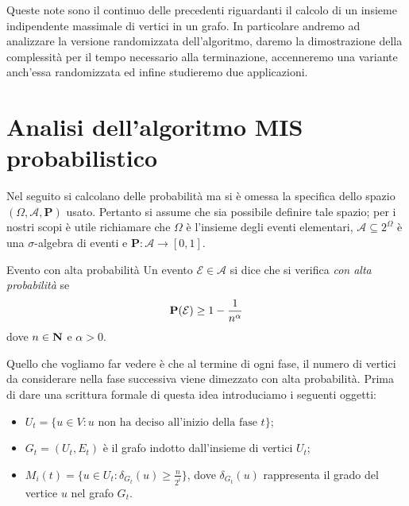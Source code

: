 \documentclass{article}
\begin{document}
\maketitle

Queste note sono il continuo delle precedenti riguardanti il calcolo di
un insieme indipendente massimale di vertici in un grafo. In particolare
andremo ad analizzare la versione randomizzata dell'algoritmo, daremo la 
dimostrazione della complessit\`a per il tempo necessario alla terminazione, 
accenneremo una variante anch'essa randomizzata ed infine studieremo due applicazioni.

\section{Analisi dell'algoritmo MIS probabilistico}
Nel seguito si calcolano delle probabilit\`a ma si \`e omessa la
specifica dello spazio $(\Omega, \mathcal{A}, \mathbf{P})$ 
usato. Pertanto si assume che sia possibile definire tale spazio; per i
nostri scopi \`e utile richiamare che $\Omega$ \`e l'insieme degli 
eventi elementari, $\mathcal{A}\subseteq 2^{\Omega}$ 
\`e una $\sigma$-algebra di eventi e 
$\mathbf{P}: \mathcal{A} \rightarrow [0,1]$.

\begin{defn}{Evento con alta probabilit\`a}
Un evento $\mathcal{E} \in \mathcal{A}$ si dice che si verifica \emph{
con alta probabilit\`a} se 
\begin{displaymath}
    \mathbf{P}(\mathcal{E}) \geq 1 - {{1} \over {n^\alpha}} 
\end{displaymath}
dove $n \in \mbox{{\bfseries N}}$ e $\alpha > 0$.
\end{defn}


Quello che vogliamo far vedere \`e che al termine di ogni fase, il 
numero di vertici da considerare nella fase successiva viene 
dimezzato con alta probabilit\`a. Prima di dare una scrittura formale di 
questa idea introduciamo i seguenti oggetti:
\begin{itemize}
    \item $U_t = \lbrace u \in V : u \text{ non ha deciso all'inizio della
        fase } t \rbrace$;
    \item $G_t = (U_t, E_t)$ \`e il grafo indotto dall'insieme di vertici $U_t$;
    \item $M_i(t) = \lbrace u \in U_t : \delta_{G_t}(u) \geq 
        \frac{n}{2^i} \rbrace$, dove $\delta_{G_t}(u)$ rappresenta il grado
        del vertice $u$ nel grafo $G_t$.
\end{itemize}
\end{document}
